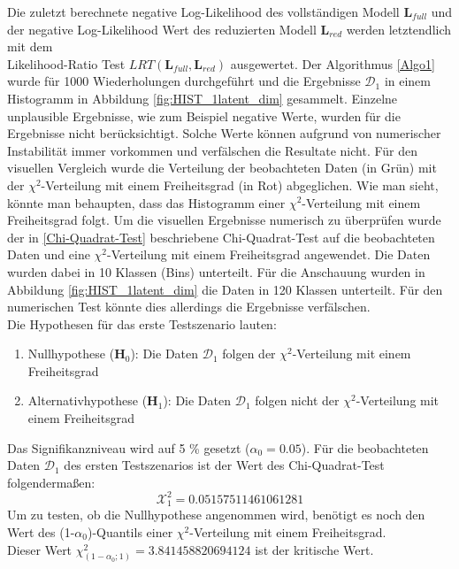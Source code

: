 \documentclass[%
thesis=student,%
coverpage=false,%
titlepage=false,%
headmarks=true, %
german,%
font=libertine, %
math=newpxtx, %
BCOR=5mm,%
coverBCOR=11mm%
]{tumbook}
\theoremstyle{break}
\begin{document}
Die zuletzt berechnete negative Log-Likelihood des vollständigen Modell $\mathbf{L}_{full}$ und der negative Log-Likelihood Wert des reduzierten Modell $\mathbf{L}_{red}$ werden letztendlich mit dem \\ Likelihood-Ratio Test $LRT(\mathbf{L}_{full},\mathbf{L}_{red})$ ausgewertet. Der Algorithmus \ref{Algo1} wurde für 1000 Wiederholungen durchgeführt und die Ergebnisse $\mathcal{D}_1$ in einem Histogramm in Abbildung \ref{fig:HIST_1latent_dim} gesammelt. Einzelne unplausible Ergebnisse, wie zum Beispiel negative Werte, wurden für die Ergebnisse nicht berücksichtigt. Solche Werte können aufgrund von numerischer Instabilität immer vorkommen und verfälschen die Resultate nicht. Für den visuellen Vergleich wurde die Verteilung der beobachteten Daten (in Grün) mit der $\chi^2$-Verteilung mit einem Freiheitsgrad (in Rot) abgeglichen. Wie man sieht, könnte man behaupten, dass das Histogramm einer $\chi^2$-Verteilung mit einem Freiheitsgrad folgt. Um die visuellen Ergebnisse numerisch zu überprüfen wurde der in \ref{Chi-Quadrat-Test} beschriebene Chi-Quadrat-Test auf die beobachteten Daten und eine $\chi^2$-Verteilung mit einem Freiheitsgrad angewendet. Die Daten wurden dabei in 10 Klassen (Bins) unterteilt. Für die Anschauung wurden in Abbildung \ref{fig:HIST_1latent_dim} die Daten in 120 Klassen unterteilt. Für den numerischen Test könnte dies allerdings die Ergebnisse verfälschen.\\
Die Hypothesen für das erste Testszenario lauten:\\
\begin{enumerate}
	\item Nullhypothese ($\mathbf{H}_0$): Die Daten $\mathcal{D}_1$ folgen der $\chi^2$-Verteilung mit einem Freiheitsgrad\\
	\item Alternativhypothese ($\mathbf{H}_1$): Die Daten $\mathcal{D}_1$ folgen nicht der $\chi^2$-Verteilung mit einem Freiheitsgrad \\
\end{enumerate}
Das Signifikanzniveau wird auf 5 \% gesetzt ($\alpha_0 = 0.05$).
Für die beobachteten Daten $\mathcal{D}_1$ des ersten Testszenarios ist der Wert des Chi-Quadrat-Test folgendermaßen:\\
$$\mathcal{X}^2_1 = 0.05157511461061281$$
Um zu testen, ob die Nullhypothese angenommen wird, benötigt es noch den Wert des (1-$\alpha_0$)-Quantils einer $\chi^2$-Verteilung mit einem Freiheitsgrad.\\
Dieser Wert $\chi^2_{(1-\alpha_0; 1)} = 3.841458820694124$ ist der kritische Wert.
\end{document}
